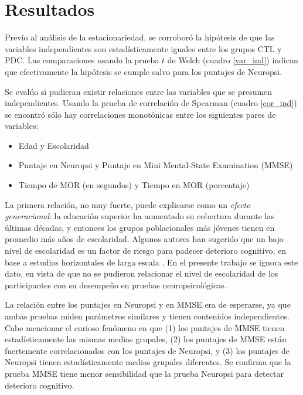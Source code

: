 
\chapter{Resultados}

Previo al análisis de la estacionariedad, se corroboró la hipótesis de que las variables 
independientes son estadísticamente iguales entre los grupos CTL y PDC. Las comparaciones
usando la prueba $t$ de Welch (cuadro \ref{var_ind}) indican que efectivamente la hipótesis se cumple salvo
para los puntajes de Neuropsi.

Se evalúo si pudieran existir relaciones entre las variables que se presumen independientes.
Usando la prueba de correlación de Spearman (cuadro \ref{cor_ind}) se encontró sólo hay 
correlaciones monotónicas entre los siguientes pares de variables:
\begin{itemize}
\item Edad y Escolaridad
\item Puntaje en Neuropsi y Puntaje en Mini Mental-State Examination (MMSE)
\item Tiempo de MOR (en segundos) y Tiempo en MOR (porcentaje)
\end{itemize}

La primera relación, no muy fuerte, puede explicarse como un \textit{efecto generacional}: la educación 
superior ha aumentado su cobertura durante las últimas décadas, y entonces los grupos poblacionales 
más jóvenes tienen en promedio más años de escolaridad. 
%
Algunos autores han sugerido que un bajo nivel de escolaridad es un factor de riesgo para padecer
deterioro cognitivo, en base a estudios horizontales de larga escala \cite{Mejia_Arango2007}.
%
En el presente trabajo se ignora este dato, en vista de que no se pudieron relacionar el nivel de 
escolaridad de los participantes con su desempeño en pruebas neuropsicológicas.

La relación entre los puntajes en Neuropsi y en MMSE era de esperarse, ya que ambas pruebas miden
parámetros similares y tienen contenidos independientes. Cabe mencionar el curioso fenómeno en que (1) 
los puntajes de MMSE
tienen estadísticamente las mismas medias grupales, (2) los puntajes de MMSE están 
fuertemente correlacionados con los puntajes de Neuropsi, y (3) los puntajes de Neuropsi
tienen estadísticamente medias grupales diferentes. Se confirma que la prueba MMSE
tiene menor sensibilidad que la prueba Neuropsi para detectar deterioro cognitivo.

